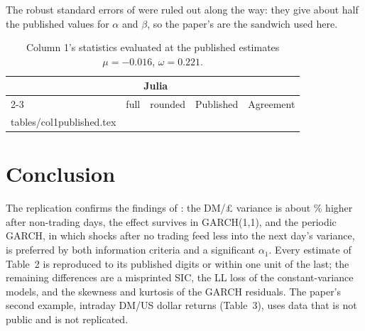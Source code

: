 \documentclass[11pt]{article}
\makeatletter
\newcommand{\rows}[1]{\@@input #1 }
\newenvironment{replication}{%
  \begin{tabular}{lrrrl}
  \toprule
  & \multicolumn{2}{c}{Julia} & & \\
  \cmidrule(lr){2-3}
  & full & rounded & Published & Agreement \\
  \midrule}{%
  \bottomrule
  \end{tabular}}
\makeatother
\begin{document}
The robust standard errors of \citet{bollerslev1992qmle} were ruled out along the way: they give about half the published values for $\alpha$ and $\beta$, so the paper's are the sandwich used here.

\begin{table}[htbp]
  \centering
  \caption{Column 1's statistics evaluated at the published estimates $\mu = -0.016$, $\omega = 0.221$.}
  \label{tab:col1published}
  \begin{replication}
  \rows{tables/col1published.tex}
  \end{replication}
\end{table}

\section{Conclusion}

The replication confirms the findings of \citet{bollerslev1996periodic}: the DM/\pounds{} variance is about \varlarger\% higher after non-trading days, the effect survives in GARCH(1,1), and the periodic GARCH, in which shocks after no trading feed less into the next day's variance, is preferred by both information criteria and a significant $\alpha_1$. Every estimate of Table~2 is reproduced to its published digits or within one unit of the last; the remaining differences are a misprinted SIC, the LL loss of the constant-variance models, and the skewness and kurtosis of the GARCH residuals. The paper's second example, intraday DM/US dollar returns (Table~3), uses data that is not public and is not replicated.



\end{document}
